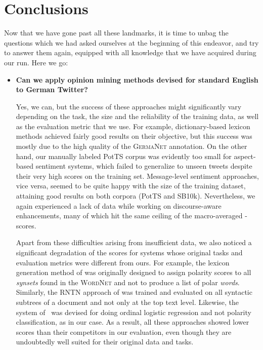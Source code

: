 \section*{Conclusions}

Now that we have gone past all these landmarks, it is time to unbag
the questions which we had asked ourselves at the beginning of this
endeavor, and try to answer them again, equipped with all knowledge
that we have acquired during our run.  Here we go:

\begin{itemize}
  \item\textbf{Can we apply opinion mining methods devised for
    standard English to German Twitter?}

    Yes, we can, but the success of these approaches might
    significantly vary depending on the task, the size and the
    reliability of the training data, as well as the evaluation metric
    that we use. For example, dictionary-based lexicon methods
    achieved fairly good results on their objective, but this success
    was mostly due to the high quality of the \textsc{GermaNet}
    annotation.  On the other hand, our manually labeled PotTS corpus
    was evidently too small for aspect-based sentiment systems, which
    failed to generalize to unseen tweets despite their very high
    scores on the training set.  Message-level sentiment approaches,
    vice versa, seemed to be quite happy with the size of the training
    dataset, attaining good results on both corpora (PotTS and SB10k).
    Nevertheless, we again experienced a lack of data while working on
    discourse-aware enhancements, many of which hit the same ceiling
    of the macro-averaged \F{}-scores.

    Apart from these difficulties arising from insufficient data, we
    also noticed a significant degradation of the scores for systems
    whose original tasks and evaluation metrics were different from
    ours.  For example, the lexicon generation method of
    \citet{Esuli:05} was originally designed to assign polarity scores
    to all \emph{synsets} found in the \textsc{WordNet} and not to
    produce a list of polar \emph{words}.  Similarly, the RNTN
    approach of \citet{Socher:13} was trained and evaluated on all
    syntactic subtrees of a document and not only at the top text
    level.  Likewise, the system of~\citet{Yessenalina:11} was devised
    for doing ordinal logistic regression and not polarity
    classification, as in our case.  As a result, all these approaches
    showed lower scores than their competitors in our evaluation, even
    though they are undoubtedly well suited for their original data
    and tasks.


\end{itemize}
